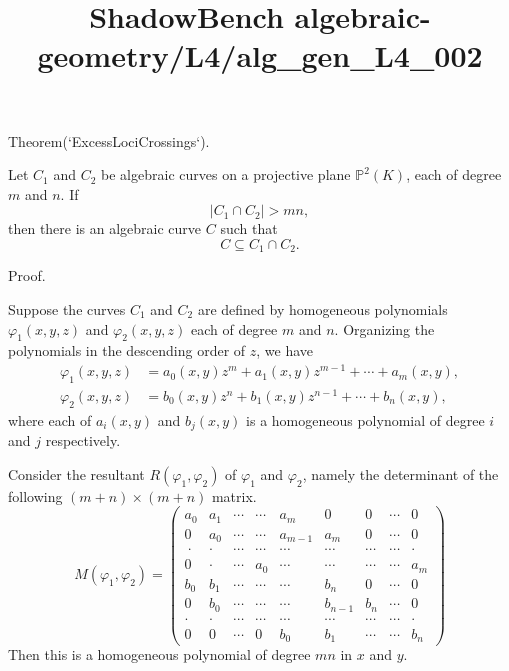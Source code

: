 \documentclass{article}
\title{ShadowBench algebraic-geometry/L4/alg\_gen\_L4\_002}
\begin{document}
\maketitle

Theorem(`ExcessLociCrossings`).

Let $C_1$ and $C_2$ be algebraic curves on a projective plane $\mathbb{P}^2(K)$, each of degree $m$ and $n$. If
$$
|C_1 \cap C_2| > mn,
$$
then there is an algebraic curve $C$ such that
$$
C \subseteq C_1 \cap C_2.
$$

Proof.

Suppose the curves $C_1$ and $C_2$ are defined by homogeneous polynomials $\varphi_1(x, y, z)$ and $\varphi_2(x, y, z)$ each of degree $m$ and $n$. Organizing the polynomials in the descending order of $z$, we have
$$
\begin{align*}
\varphi_1(x, y, z) &= a_0(x,y)z^m + a_1(x,y)z^{m-1} + \cdots + a_m(x, y),\\
\varphi_2(x,y,z) &= b_0(x,y)z^n + b_1(x,y)z^{n-1} + \cdots + b_n(x,y),
\end{align*}
$$
where each of $a_i(x,y)$ and $b_j(x,y)$ is a homogeneous polynomial of degree $i$ and $j$ respectively.

Consider the resultant $R(\varphi_1, \varphi_2)$ of $\varphi_1$ and $\varphi_2$, namely the determinant of the following $(m+n)\times(m+n)$ matrix.
$$
M(\varphi_1, \varphi_2) = \begin{pmatrix}
a_0 & a_1 & \cdots & \cdots & a_m & 0 & 0 & \cdots & 0 \\
0 & a_0 & \cdots & \cdots & a_{m-1} & a_m & 0 & \cdots & 0 \\\
\cdot & \cdot & \cdots & \cdots & \cdots & \cdots &  \cdots & \cdots & \cdot \\
0 & \cdot & \cdots & a_0 & \cdots & \cdots & \cdots & \cdots & a_m \\
b_0 & b_1 & \cdots & \cdots & \cdots & b_n & 0 & \cdots & 0 \\
0 & b_0 & \cdots & \cdots & \cdots & b_{n-1} & b_n & \cdots & 0 \\
\cdot & \cdot & \cdots & \cdots & \cdots & \cdots & \cdots & \cdots &\cdot \\
0 & 0 & \cdots & 0 & b_0 & b_1 & \cdots & \cdots & b_n
\end{pmatrix}
$$
Then this is a homogeneous polynomial of degree $mn$ in $x$ and $y$.
\end{document}
